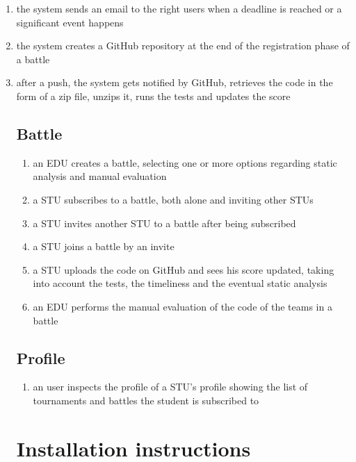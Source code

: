 \begin{enumerate}
    \item the system sends an email to the right users when a deadline is reached or a significant event happens
    \item the system creates a GitHub repository at the end of the registration phase of a battle
    \item after a push, the system gets notified by GitHub, retrieves the code in the form of a zip file, unzips it, runs the tests and updates the score

\section{Battle}

\begin{enumerate}
    \item an EDU creates a battle, selecting one or more options regarding static analysis and manual evaluation
    \item a STU subscribes to a battle, both alone and inviting other STUs
    \item a STU invites another STU to a battle after being subscribed
    \item a STU joins a battle by an invite
    \item a STU uploads the code on GitHub and sees his score updated, taking into account the tests, the timeliness and the eventual static analysis
    \item an EDU performs the manual evaluation of the code of the teams in a battle
\end{enumerate}

\section{Profile}

\begin{enumerate}
    \item an user inspects the profile of a STU's profile showing the list of tournaments and battles the student is subscribed to
\end{enumerate}

\chapter{Installation instructions}

\end{enumerate}
